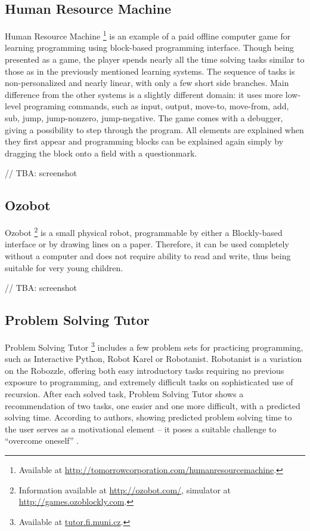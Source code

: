 \documentclass[
    digital,    %
    oneside,    %
    color,
    11pt,
    nocover,
    notable,
    nolof,
    nolot,
    final
]{fithesis3}
\begin{document}
\subsection{Human Resource Machine}
\label{sec:human-resource-machine}
Human Resource Machine%
\footnote{Available at \url{http://tomorrowcorporation.com/humanresourcemachine}.}
is an example of a paid offline computer game for learning programming using block-based programming interface.
Though being presented as a game,
the player spends nearly all the time solving tasks similar to those as in the previously mentioned learning systems.
The sequence of tasks is non-personalized and nearly linear,
with only a few short side branches.
Main difference from the other systems is a slightly different domain:
it uses more low-level programing commands, such as
input, output, move-to, move-from, add, sub, jump, jump-nonzero, jump-negative.
The game comes with a debugger, giving a possibility to step through the program.
All elements are explained when they first appear and programming blocks can be explained again simply by dragging the block onto a field with a questionmark.

// TBA: screenshot


\subsection{Ozobot}
\label{sec:ozobot}
Ozobot%
\footnote{Information available at \url{http://ozobot.com/}, simulator at \url{http://games.ozoblockly.com}.}
is a small physical robot,
programmable by either a Blockly-based interface or by drawing lines on a paper.
Therefore, it can be used completely without a computer and does not require ability to read and write,
thus being suitable for very young children.

// TBA: screenshot


\subsection{Problem Solving Tutor}
\label{sec:problem-solving-tutor}
Problem Solving Tutor%
\footnote{Available at \url{tutor.fi.muni.cz}.}
includes a few problem sets for practicing programming,
such as Interactive Python, Robot Karel or Robotanist.
Robotanist is a variation on the Robozzle,
offering both easy introductory tasks requiring no previous exposure to programming,
and extremely difficult tasks on sophisticated use of recursion.
After each solved task, Problem Solving Tutor shows a recommendation of two tasks,
one easier and one more difficult,
with a predicted solving time.
According to authors, showing predicted problem solving time to the user serves as a motivational element
– it poses a suitable challenge to ``overcome oneself''
\cite{pelanek-student-modeling-times}.
\end{document}
